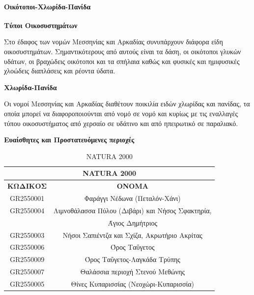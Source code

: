 \documentclass[12pt]{article}
\newcommand{\gr}{\selectlanguage{greek}}
\newcommand{\eng}{\selectlanguage{english}}
\begin{document}
	\paragraph{Οικότοποι-Χλωρίδα-Πανίδα}
	
	\textbf{Τύποι Οικοσυστημάτων}
	
	Στο έδαφος των νομών Μεσσηνίας και Αρκαδίας συνυπάρχουν διάφορα είδη οικοσυστημάτων. Σημαντικότερους από αυτούς είναι τα δάση, οι οικότοποι γλυκών υδάτων, οι βραχώδεις οικότοποι και τα σπήλαια καθώς και φυσικές και ημιφυσικές χλοώδεις διαπλάσεις και ρέοντα ύδατα.
	
	\textbf{Χλωρίδα-Πανίδα}
	
	Οι νομοί Μεσσηνίας και Αρκαδίας διαθέτουν ποικιλία ειδών χλωρίδας και πανίδας,  τα οποία μπορεί να διαφοροποιούνται από νομό σε νομό και κυρίως με τις εναλλαγές τύπου οικοσυστήματος από χερσαίο σε υδάτινο και από ηπειρωτικό σε παραλιακό.
	
	\textbf{Ευαίσθητες και Προστατευόμενες περιοχές}
	
	\begin{table}[H]
		\centering
		\begin{tabular}{|c|c|}
			\hline
			\multicolumn{2}{|c|}{\textbf{\eng NATURA 2000 \gr}} \\ \hline
			\textbf{ΚΩΔΙΚΟΣ} & \textbf{ΟΝΟΜΑ} \\ \hline
			\eng GR2550001 & Φαράγγι Νέδωνα (Πεταλόν-Χάνι) \\ \hline
			\eng GR2550004 & Λιμνοθάλασσα Πύλου (Διβάρι) και Νήσος Σφακτηρία, \\ & Άγιος Δημήτριος \\ \hline
			\eng GR2550003 \gr & Νήσοι Σαπιέντζα και Σχίζα, Ακρωτήριο Ακρίτας \\ \hline
			\eng GR2550006 \gr & Όρος Ταΰγετος \\ \hline
			\eng GR2550009 \gr & Όρος Ταΰγετος-Λαγκάδα Τρύπης \\ \hline
			\eng GR2550007 \gr & Θαλάσσια περιοχή Στενού Μεθώνης \\ \hline
			\eng GR2550005 \gr & Θίνες Κυπαρισσίας (Νεοχώρι-Κυπαρισσία) \\ \hline
		\end{tabular}
		\caption{\eng NATURA 2000 \gr}
		\label{The label}
	\end{table}
	
\end{document}

